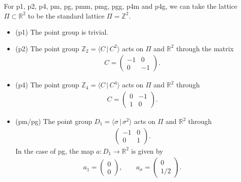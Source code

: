\documentclass[pdftex]{sigma}
\theoremstyle{definition}
\newcommand{\R}{\mathbb{R}}
\newcommand{\Z}{\mathbb{Z}}
\begin{document}
For \textsf{p1}, \textsf{p2}, \textsf{p4}, \textsf{pm}, \textsf{pg}, \textsf{pmm}, \textsf{pmg}, \textsf{pgg}, \textsf{p4m} and \textsf{p4g}, we can take the lattice $\Pi \subset \R^2$ to be the standard lattice $\Pi = \Z^2$.
\begin{itemize}\itemsep=0pt
\item
(\textsf{p1})
The point group is trivial.

\item
(\textsf{p2})
The point group $\Z_2 = \langle C \,|\, C^2 \rangle$ acts on $\Pi$ and $\R^2$ through the matrix
\begin{gather*}
C =
\left(
\begin{matrix}
-1 & 0 \\
0 & -1
\end{matrix}
\right).
\end{gather*}

\item
(\textsf{p4})
The point group $\Z_4 = \langle C \,|\, C^4 \rangle$ acts on $\Pi$ and $\R^2$ through
\begin{gather*}
C =
\left(
\begin{matrix}
0 & -1 \\
1 & 0
\end{matrix}
\right).
\end{gather*}

\item
(\textsf{pm/pg})
The point group $D_1 = \langle \sigma \,|\, \sigma^2 \rangle$ acts on $\Pi$ and $\R^2$ through
\begin{gather*}
\left(
\begin{matrix}
-1 & 0 \\
0 & 1
\end{matrix}
\right).
\end{gather*}
In the case of \textsf{pg}, the map $a \colon D_1 \to \R^2$ is given by
\begin{gather*}
a_1 =
\left(
\begin{matrix}
0 \\ 0
\end{matrix}
\right),\qquad
a_{\sigma} =
\left(
\begin{matrix}
0 \\ 1/2
\end{matrix}
\right).
\end{gather*}


\end{itemize}
\end{document}
